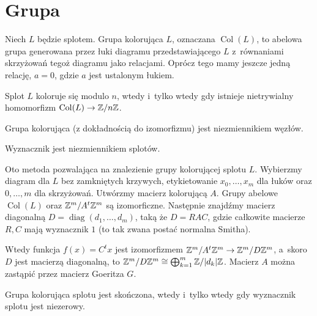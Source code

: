 \section{Grupa} %
\label{sec:section_name}
\begin{definition} \label{colgrp_def}
    Niech $L$ będzie splotem.
    Grupa kolorująca $L$, oznaczana $\operatorname{Col}(L)$, to abelowa grupa generowana przez łuki diagramu przedstawiającego $L$ z~równaniami skrzyżowań tegoż diagramu jako relacjami.
    Oprócz tego mamy jeszcze jedną relację, $a = 0$, gdzie $a$ jest ustalonym łukiem.
\end{definition}

\begin{proposition} \label{morphism_colour}
    Splot $L$ koloruje się modulo $n$, wtedy i~tylko wtedy gdy istnieje nietrywialny homomorfizm $\operatorname{Col}(L) \to \mathbb Z/n\mathbb Z$.
\end{proposition}

\begin{proposition}
    Grupa kolorująca (z dokładnością do izomorfizmu) jest niezmiennikiem węzłów.
\end{proposition}

\begin{corollary} \label{det_invariant}
    Wyznacznik jest niezmiennikiem splotów.
\end{corollary}

Oto metoda pozwalająca na znalezienie grupy kolorującej splotu $L$.
Wybierzmy diagram dla $L$ bez zamkniętych krzywych, etykietowanie $x_0, \ldots, x_m$ dla łuków oraz $0, \ldots, m$ dla skrzyżowań.
Utwórzmy macierz kolorującą $A$.
Grupy abelowe $\operatorname{Col}(L)$ oraz $\mathbb Z^m / A^t \mathbb Z^m$ są izomorficzne.
Następnie znajdźmy macierz diagonalną $D = \operatorname{diag}(d_1, \ldots, d_m)$, taką że $D = RAC$, gdzie całkowite macierze $R, C$ mają wyznacznik $1$ (to tak zwana postać normalna Smitha).

Wtedy funkcja $f(x) = C^tx$ jest izomorfizmem $\mathbb Z^m/A^t \mathbb Z^m \to \mathbb Z^m / D\mathbb Z^m$, a~skoro $D$ jest macierzą diagonalną, to $\mathbb Z^m/D\mathbb Z^m \cong \bigoplus_{k=1}^m \mathbb Z/{|d_k|} \mathbb Z$.
Macierz $A$ można zastąpić przez macierz Goeritza $G$.

\begin{proposition}
    Grupa kolorująca splotu jest skończona, wtedy i~tylko wtedy gdy wyznacznik splotu jest niezerowy.
\end{proposition}


